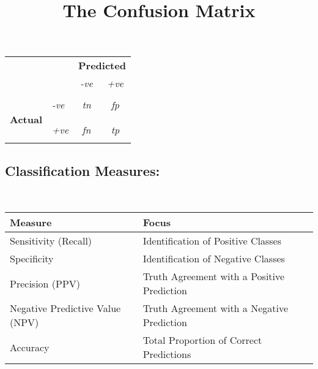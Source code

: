\documentclass[11pt]{article}
\title{The Confusion Matrix}
\author{\myname}
\date{}   %
\begin{document}
\maketitle

\setlength{\tabcolsep}{1cm}
\begin{tabular}{l l | c | c |}
  \multicolumn{2}{c}{} &  \multicolumn{2}{c}{\textbf{Predicted}} \\[7pt]
  & \multicolumn{1}{c}{} & \multicolumn{1}{c}{\emph{-ve}} & \multicolumn{1}{c}{\emph{+ve}} \\[7pt]
  \cline{3-4}
  &&& \\[7pt]
  \multirow{6}{*}{\textbf{Actual}}    & \emph{-ve}  & \emph{\Large{tn}}    & \emph{\Large{fp}} \\[7pt]
  &&& \\[7pt]
  \cline{3-4}
  &&& \\[7pt]
                          & \emph{+ve}  & \emph{\Large{fn}}    & \emph{\Large{tp}}   \\[7pt]
  &&& \\[7pt]
  \cline{3-4}
\end{tabular}

\subsection*{Classification Measures:}
\

\renewcommand{\arraystretch}{1.5}
\setlength{\tabcolsep}{0.5cm}
\begin{tabular}{| l | l |}
  \hline
  \textbf{Measure}       & \textbf{Focus}  \\
  \hline
  Sensitivity (Recall)   & Identification of Positive Classes \\
  Specificity            & Identification of Negative Classes \\
  Precision (PPV)        & Truth Agreement with a Positive Prediction \\
  Negative Predictive Value (NPV)  & Truth Agreement with a Negative Prediction \\
  Accuracy               & Total Proportion of Correct Predictions \\
  \hline
\end{tabular}

\bigskip
\end{document}
